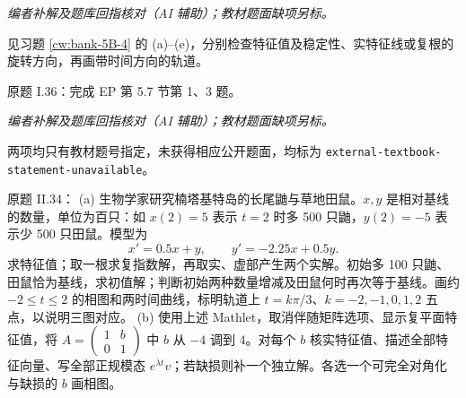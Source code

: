 \begin{solution}
\textit{编者补解及题库回指核对（AI 辅助）；教材题面缺项另标。}\par
见习题 \ref{cw:bank-5B-4} 的 (a)--(e)，分别检查特征值及稳定性、实特征线或复根的旋转方向，再画带时间方向的轨道。\end{solution}
\begin{exercise}\label{cw:ps9-I-36}原题 I.36：完成 EP 第 5.7 节第 1、3 题。\end{exercise}
\begin{solution}
\textit{编者补解及题库回指核对（AI 辅助）；教材题面缺项另标。}\par
两项均只有教材题号指定，未获得相应公开题面，均标为 \texttt{external-textbook-statement-unavailable}。\end{solution}
\begin{exercise}\label{cw:ps9-II-34}原题 II.34：
(a) 生物学家研究楠塔基特岛的长尾鼬与草地田鼠。$x,y$ 是相对基线的数量，单位为百只：如 $x(2)=5$ 表示 $t=2$ 时多 500 只鼬，$y(2)=-5$ 表示少 500 只田鼠。模型为
\[x'=0.5x+y,\qquad y'=-2.25x+0.5y.\]
求特征值；取一根求复指数解，再取实、虚部产生两个实解。初始多 100 只鼬、田鼠恰为基线，求初值解；判断初始两种数量增减及田鼠何时再次等于基线。画约 $-2\le t\le2$ 的相图和两时间曲线，标明轨道上 $t=k\pi/3$、$k=-2,-1,0,1,2$ 五点，以说明三图对应。
(b) 使用上述 Mathlet，取消伴随矩阵选项、显示复平面特征值，将 $A=\begin{pmatrix}1&b\\0&1\end{pmatrix}$ 中 $b$ 从 $-4$ 调到 $4$。对每个 $b$ 核实特征值、描述全部特征向量、写全部正规模态 $e^{\lambda t}v$；若缺损则补一个独立解。各选一个可完全对角化与缺损的 $b$ 画相图。\end{exercise}
